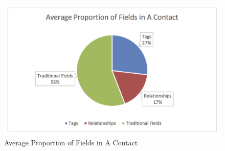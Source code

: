 \begin{figure}[!h]
\begin{centering}
\includegraphics[scale=0.7]{pics/average_contact_fields.png}
\caption{Average Proportion of Fields in A Contact}\label{fig:average_contact_fields}
\end{centering}
\end{figure}

